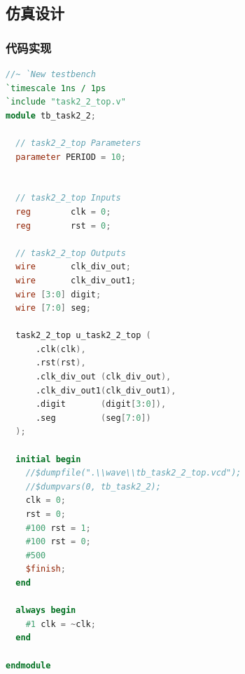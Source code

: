 \documentclass[UTF8]{ctexart}
\begin{document}
\subsection{仿真设计}
\subsubsection{代码实现}
\begin{framed}
	\begin{lstlisting}[language=verilog,style=verilogStyle]
		//~ `New testbench
`timescale 1ns / 1ps
`include "task2_2_top.v"
module tb_task2_2;

  // task2_2_top Parameters
  parameter PERIOD = 10;


  // task2_2_top Inputs
  reg        clk = 0;
  reg        rst = 0;

  // task2_2_top Outputs
  wire       clk_div_out;
  wire       clk_div_out1;
  wire [3:0] digit;
  wire [7:0] seg;

  task2_2_top u_task2_2_top (
      .clk(clk),
      .rst(rst),
      .clk_div_out (clk_div_out),
      .clk_div_out1(clk_div_out1),
      .digit       (digit[3:0]),
      .seg         (seg[7:0])
  );

  initial begin
    //$dumpfile(".\\wave\\tb_task2_2_top.vcd");
    //$dumpvars(0, tb_task2_2);
    clk = 0;
    rst = 0;
    #100 rst = 1;
    #100 rst = 0;
    #500
    $finish;
  end

  always begin
    #1 clk = ~clk;
  end

endmodule
\end{lstlisting}
\end{framed}
\end{document}
